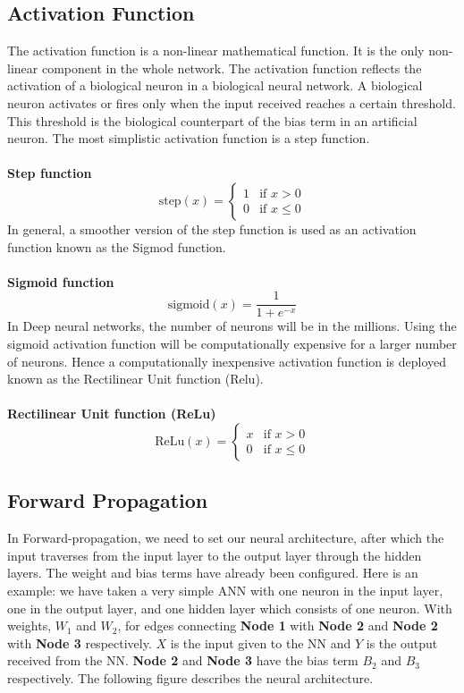 \documentclass[12pt,a4paper,bold]{thesis}
\theoremstyle{thm}
\theoremstyle{definition}
\begin{document}
\subsection{Activation Function}
The activation function is a non-linear mathematical function. It is the only non-linear component in the whole network. The activation function reflects the activation of a biological neuron in a biological neural network. A biological neuron activates or fires only when the input received reaches a certain threshold. This threshold is the biological counterpart of the bias term in an artificial neuron. The most simplistic activation function is a step function.\\\\
\textbf{Step function}
\[
\text{step}(x)=
\begin{cases}
	1 & \text{if } x>0\\
	0 & \text{if } x\leq0
\end{cases}
\]
In general, a smoother version of the step function is used as an activation function known as the Sigmod function.\\\\
\textbf{Sigmoid function}
\[\text{sigmoid}(x)=\frac{1}{1+e^{-x}}\]
In Deep neural networks, the number of neurons will be in the millions. Using the sigmoid activation function will be computationally expensive for a larger number of neurons. Hence a computationally inexpensive activation function is deployed known as the Rectilinear Unit function (Relu).\\\\
\textbf{Rectilinear Unit function (ReLu)}
\[
\text{ReLu}(x)=
\begin{cases}
	x & \text{if } x>0\\
	0 & \text{if } x\leq0
\end{cases}
\]


\subsection{Forward Propagation}
In Forward-propagation, we need to set our neural architecture, after which the input traverses from the input layer to the output layer through the hidden layers. The weight and bias terms have already been configured. Here is an example: we have taken a very simple ANN with one neuron in the input layer, one in the output layer, and one hidden layer which consists of one neuron. With weights, $W_1$ and $W_2$, for edges connecting \textbf{Node 1} with \textbf{Node 2} and \textbf{Node 2} with \textbf{Node 3} respectively. $X$ is the input given to the NN and $Y$ is the output received from the NN. \textbf{Node 2} and \textbf{Node 3} have the bias term \textbf{$B_2$} and \textbf{$B_3$} respectively. The following figure describes the neural architecture.
\end{document}

